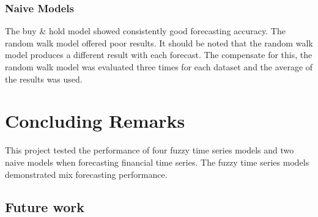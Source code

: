 \documentclass[12pt, oneside, a4paper]{article}
\theoremstyle{definition}
\begin{document}
\subsubsection{Naive Models}

The buy \& hold model showed consistently good forecasting accuracy. The random walk model offered poor results. It should be noted that the random walk model produces a different result with each forecast. The compensate for this, the random walk model was evaluated three times for each dataset and the average of the results was used.

\section{Concluding Remarks}

This project tested the performance of four fuzzy time series models and two naive models when forecasting financial time series. The fuzzy time series models demonstrated mix forecasting performance. 

\subsection{Future work}
\end{document}
